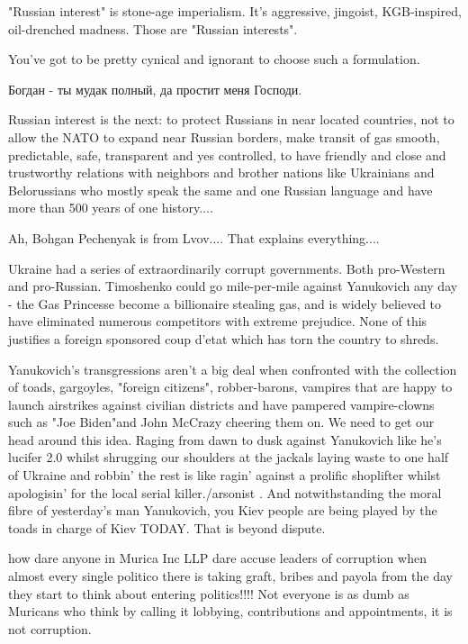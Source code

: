 \begin{itemize}
\begin{itemize}

"Russian interest" is stone-age imperialism. It's aggressive, jingoist,
KGB-inspired, oil-drenched madness. Those are "Russian interests".

You've got to be pretty cynical and ignorant to choose such a formulation.


Богдан - ты мудак полный, да простит меня Господи.


Russian interest is the next: to protect Russians in near located countries,
not to allow the NATO to expand near Russian borders, make transit of gas
smooth, predictable, safe, transparent and yes controlled, to have friendly and
close and trustworthy relations with neighbors and brother nations like
Ukrainians and Belorussians who mostly speak the same and one Russian language
and have more than 500 years of one history....

Ah, Bohgan Pechenyak is from Lvov.... That explains everything....


Ukraine had a series of extraordinarily corrupt governments. Both pro-Western
and pro-Russian. Timoshenko could go mile-per-mile against Yanukovich any day -
the Gas Princesse become a billionaire stealing gas, and is widely believed to
have eliminated numerous competitors with extreme prejudice. None of this
justifies a foreign sponsored coup d'etat which has torn the country to shreds.


Yanukovich's transgressions aren't a big deal when confronted with the
collection of toads, gargoyles, "foreign citizens", robber-barons, vampires
that are happy to launch airstrikes against civilian districts and have
pampered vampire-clowns such as "Joe Biden"and John McCrazy cheering them on.
We need to get our head around this idea. Raging from dawn to dusk against
Yanukovich like he's lucifer 2.0 whilst shrugging our shoulders at the jackals
laying waste to one half of Ukraine and robbin' the rest is like ragin' against
a prolific shoplifter whilst apologisin' for the local serial killer./arsonist
. And notwithstanding the moral fibre of yesterday's man Yanukovich, you Kiev
people are being played by the toads in charge of Kiev TODAY. That is beyond
dispute.



how dare anyone in Murica Inc LLP dare accuse leaders of corruption when almost
every single politico there is taking graft, bribes and payola from the day
they start to think about entering politics!!!! Not everyone is as dumb as
Muricans who think by calling it lobbying, contributions and appointments, it
is not corruption.


\end{itemize}
\end{itemize}
